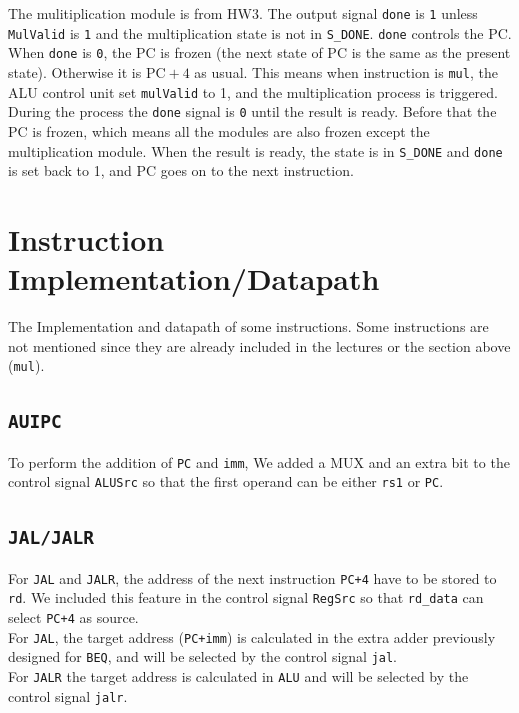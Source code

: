 \documentclass[12pt]{article}
\begin{document}
The mulitiplication module is from HW3. The output signal \texttt{done} is 
\texttt{1} unless \texttt{MulValid} is \texttt{1} and the multiplication state
is not in \texttt{S\_DONE}. \texttt{done} controls the PC. When \texttt{done} is
\texttt{0}, the PC is frozen (the next state of PC is the same as the present state).
Otherwise it is $\text{PC}+4$ as usual. This means when instruction is \texttt{mul},
the ALU control unit set \texttt{mulValid} to 1, and the multiplication process
is triggered. During the process the \texttt{done} signal is \texttt{0} until
the result is ready. Before that the PC is frozen, which means all the modules
are also frozen except the multiplication module. When the result is ready, the
state is in \texttt{S\_DONE} and \texttt{done} is set back to 1, and PC goes 
on to the next instruction.

\section{Instruction Implementation/Datapath}

The Implementation and datapath of some instructions. Some instructions are not mentioned
since they are already included in the lectures or the section above (\texttt{mul}).

\subsection{\texttt{AUIPC}}
To perform the addition of \texttt{PC} and \texttt{imm}, We added a MUX and an extra bit to the 
control signal \texttt{ALUSrc} so that the first operand can be either \texttt{rs1}
or \texttt{PC}.

\subsection{\texttt{JAL/JALR} }
For \texttt{JAL} and \texttt{JALR}, the address of the next instruction \texttt{PC+4}
have to be stored to \texttt{rd}. We included this feature in the control signal
\texttt{RegSrc} so that \texttt{rd\_data} can select \texttt{PC+4} as source.\\
For \texttt{JAL}, the target address (\texttt{PC+imm}) is calculated in the extra adder
previously designed for \texttt{BEQ}, and will be selected by the control signal 
\texttt{jal}.\\
For \texttt{JALR} the target address is calculated in \texttt{ALU} and will be selected
by the control signal \texttt{jalr}.
\end{document}

